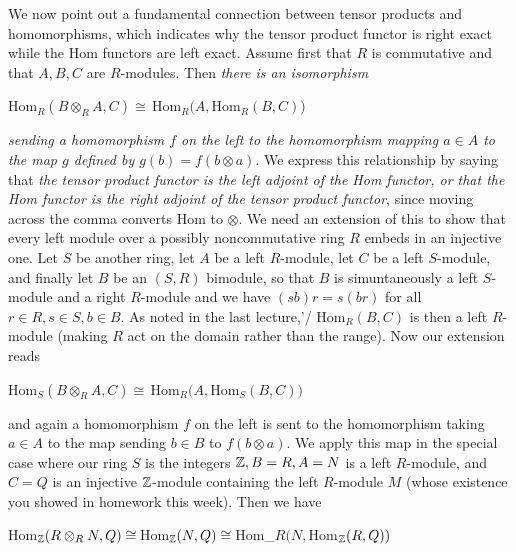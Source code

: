 We now point out a fundamental connection between tensor products and homomorphisms, which indicates why the tensor product functor is right exact while the Hom functors are left exact.  Assume first that $R$ is commutative and that $A,B,C$ are $R$-modules.  Then {\sl there is an isomorphism}

Hom$_R(B\otimes_R A,C)\cong\,$Hom$_R(A,$Hom$_R(B,C))$

{\sl sending a homomorphism $f$ on the left to the homomorphism mapping $a\in A$ to the map $g$ defined by $g(b) = f(b\otimes a)$}.  We express this relationship by saying that {\sl the tensor product functor is the left adjoint of the Hom functor, or that the Hom functor is the right adjoint of the tensor product functor}, since moving across the comma converts Hom to $\otimes$.  We need an extension of this to show that every left module over a possibly noncommutative ring $R$ embeds in an injective one.  Let $S$ be another ring, let $A$ be a left $R$-module, let $C$ be a left $S$-module, and finally let $B$ be an $(S,R)$ bimodule, so that $B$ is simuntaneously a left $S$-module and a right $R$-module and we have $(sb)r = s(br)$ for all $r\in R,s\in S,b\in B$.  As noted in the last lecture,'/
Hom$_R(B,C)$ is then a left $R$-module (making $R$ act on the domain rather than the range).  Now our extension reads

Hom$_S(B\otimes_R A,C)\cong\,$Hom$_R(A,$Hom$_S(B,C))$

and again a homomorphism $f$ on the left is sent to the homomorphism taking $a\in A$ to the map sending $b\in B$ to $f(b\otimes a)$.  We apply this map in the special case where our ring $S$ is the integers $\Bbb Z, B=R, A=N$ is a left $R$-module, and $C=Q$ is an injective $\Bbb Z$-module containing the left $R$-module $M$ (whose existence you showed in homework this week).  Then we have

Hom$_{\Bbb Z}(R\otimes_R N,Q) \cong\,$Hom$_{\Bbb Z}(N,Q)\cong\,$Hom_$R(N,$Hom$_{\Bbb Z} (R,Q))$

